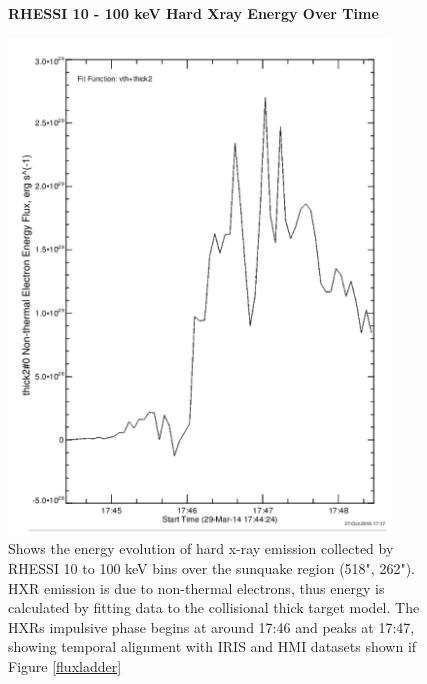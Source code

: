 \begin{figure}[H]
  \begin{center}
  \textbf{RHESSI 10 - 100 keV Hard Xray Energy Over Time}\par\medskip
  \includegraphics[width=0.9\textwidth]{rhessi-energy-curve}
  \end{center}
  \caption{Shows the energy evolution of hard x-ray emission collected by RHESSI 10 to 100 keV bins over the sunquake region (518", 262"). HXR emission is due to non-thermal electrons, thus energy is calculated by fitting data to the collisional thick target model. The HXRs impulsive phase begins at around 17:46 and peaks at 17:47, showing temporal alignment with IRIS and HMI datasets shown if Figure \ref{fluxladder}}
\end{figure}\label{erhessi}



